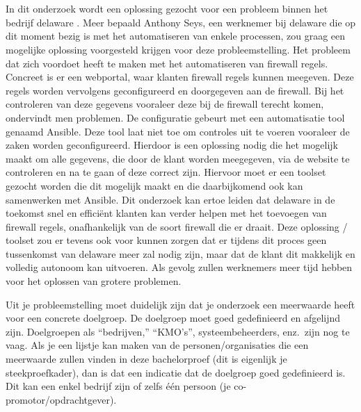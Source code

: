 \section{}%
\label{sec:probleemstelling}
In dit onderzoek wordt een oplossing gezocht voor een probleem binnen het bedrijf delaware . Meer bepaald Anthony Seys, een werknemer bij delaware die op dit moment bezig is met het automatiseren van enkele processen, zou graag een mogelijke oplossing voorgesteld krijgen voor deze probleemstelling. Het probleem dat zich voordoet heeft te maken met het automatiseren van firewall regels. Concreet is er een webportal, waar klanten firewall regels kunnen meegeven. Deze regels worden vervolgens geconfigureerd en doorgegeven aan de firewall. Bij het controleren van deze gegevens vooraleer deze bij de firewall terecht komen, ondervindt men problemen. De configuratie gebeurt met een automatisatie tool genaamd Ansible. Deze tool laat niet toe om controles uit te voeren vooraleer de zaken worden geconfigureerd. Hierdoor is een oplossing nodig   die het mogelijk maakt om alle gegevens, die door de klant worden meegegeven, via de website te controleren en na te gaan of deze correct zijn. Hiervoor moet er een toolset gezocht worden die dit mogelijk maakt en die daarbijkomend ook kan samenwerken met Ansible. Dit onderzoek kan ertoe leiden dat delaware in de toekomst snel en efficiënt klanten kan verder helpen met het toevoegen van firewall regels, onafhankelijk van de soort firewall die er draait. Deze oplossing / toolset zou er tevens ook voor kunnen zorgen dat er tijdens dit proces geen tussenkomst van delaware meer zal nodig zijn, maar dat de klant dit makkelijk en volledig autonoom kan uitvoeren. Als gevolg zullen  werknemers meer tijd hebben voor het oplossen van grotere problemen. \newline



Uit je probleemstelling moet duidelijk zijn dat je onderzoek een meerwaarde heeft voor een concrete doelgroep. De doelgroep moet goed gedefinieerd en afgelijnd zijn. Doelgroepen als ``bedrijven,'' ``KMO's'', systeembeheerders, enz.~zijn nog te vaag. Als je een lijstje kan maken van de personen/organisaties die een meerwaarde zullen vinden in deze bachelorproef (dit is eigenlijk je steekproefkader), dan is dat een indicatie dat de doelgroep goed gedefinieerd is. Dit kan een enkel bedrijf zijn of zelfs één persoon (je co-promotor/opdrachtgever).

\section{}%
\label{sec:onderzoeksvraag-TODO}


